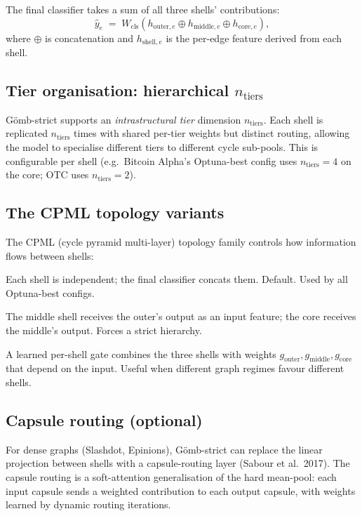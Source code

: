 \documentclass[11pt,a4paper]{article}
\theoremstyle{remark}
\newcommand{\GS}{G\"omb}
\begin{document}
The final classifier takes a sum of all three shells'
contributions:
\[
  \hat y_e \;=\; W_{\text{cls}}\!\left( h_{\text{outer}, e}
                     \oplus h_{\text{middle}, e}
                     \oplus h_{\text{core}, e} \right),
\]
where $\oplus$ is concatenation and $h_{\text{shell}, e}$ is the
per-edge feature derived from each shell.

\subsection{Tier organisation: hierarchical $n_{\text{tiers}}$}

\GS{}-strict supports an \emph{intrastructural tier} dimension
$n_{\text{tiers}}$. Each shell is replicated $n_{\text{tiers}}$
times with shared per-tier weights but distinct routing, allowing
the model to specialise different tiers to different cycle
sub-pools. This is configurable per shell (e.g.\ Bitcoin Alpha's
Optuna-best config uses $n_{\text{tiers}} = 4$ on the core; OTC
uses $n_{\text{tiers}} = 2$).

\subsection{The CPML topology variants}

The CPML (cycle pyramid multi-layer) topology family controls how
information flows between shells:

\begin{description}[font=\normalfont\emph]
\item[route] Each shell is independent; the final classifier
      concats them. Default. Used by all Optuna-best configs.
\item[structural] The middle shell receives the outer's output
      as an input feature; the core receives the middle's output.
      Forces a strict hierarchy.
\item[soft\_router] A learned per-shell gate combines the three
      shells with weights $g_{\text{outer}}, g_{\text{middle}},
      g_{\text{core}}$ that depend on the input. Useful when
      different graph regimes favour different shells.
\end{description}

\subsection{Capsule routing (optional)}

For dense graphs (Slashdot, Epinions), \GS{}-strict can replace
the linear projection between shells with a capsule-routing layer
(Sabour et al.\ 2017). The capsule routing is a soft-attention
generalisation of the hard mean-pool: each input capsule sends a
weighted contribution to each output capsule, with weights
learned by dynamic routing iterations.
\end{document}
